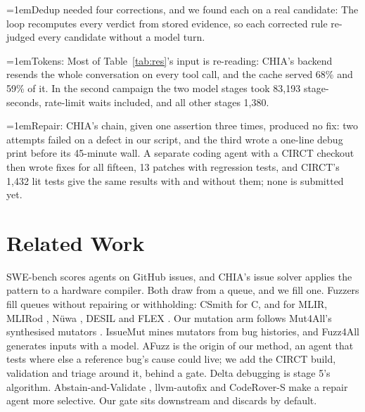 \documentclass[conference]{IEEEtran}
\newcommand{\pointhead}[1]{\par\noindent\hangindent=1em\hangafter=1\makebox[1em][l]{\textbullet}#1:}
\begin{document}
\pointhead{Dedup needed four corrections, and we found each on a real candidate}
The loop recomputes every verdict from stored evidence, so each corrected rule
re-judged every candidate without a model turn. %

\pointhead{Tokens} Most of Table~\ref{tab:res}'s input is re-reading: CHIA's
backend resends the whole conversation on every tool call, and the cache served
68\% and 59\% of it. In the second campaign the two model stages took 83,193
stage-seconds, rate-limit waits included, and all other stages 1,380. %

\pointhead{Repair} CHIA's chain, given one assertion three times, produced no
fix: two attempts failed on a defect in our script, and the third wrote a
one-line debug print before its 45-minute wall. A separate coding agent with a
CIRCT checkout then wrote fixes for all fifteen, 13 patches with regression
tests, and CIRCT's 1,432 lit tests give the same results with and without them;
none is submitted yet. %

\section{Related Work}
SWE-bench \cite{swebench} scores agents on GitHub issues, and CHIA's issue
solver \cite{chia} applies the pattern to a hardware compiler. Both draw from a
queue, and we fill one. Fuzzers fill queues without repairing or withholding:
CSmith \cite{csmith} for C, and for MLIR, MLIRod \cite{mlirod}, N\"uwa
\cite{nuwa}, DESIL \cite{desil} and FLEX \cite{flex}. Our mutation arm follows
Mut4All's synthesised mutators \cite{mut4all}. IssueMut \cite{issuemut} mines
mutators from bug histories, and Fuzz4All \cite{fuzz4all} generates inputs with
a model. AFuzz \cite{afuzz} is the origin of our method, an agent that tests
where else a reference bug's cause could live; we add the CIRCT build,
validation and triage around it, behind a gate.
Delta debugging \cite{deltadebug} is stage 5's algorithm. Abstain-and-Validate
\cite{abstain}, llvm-autofix \cite{llvmharness} and CodeRover-S
\cite{coderovers} make a repair agent more selective. Our gate sits downstream
and discards by default.
\end{document}
